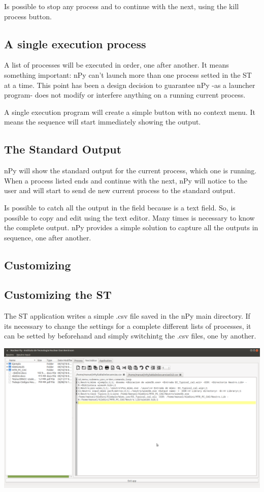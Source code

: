 \documentclass[a4paper,10pt]{article}
\begin{document}
Is possible to stop any process and to continue with the next, using the kill process button.

\subsection{A single execution process}

A list of processes will be executed in order, one after another. It means something important: nPy can't launch more than one process setted in the ST at a time. This point has been a design decision to guarantee nPy -as a launcher program- does not modify or interfere anything on a running current process.

A single execution program will create a simple button with no context menu. It means the sequence will start immediately showing the output.

\subsection{The Standard Output}

nPy will show the standard output for the current process, which one is running. When a process listed ends and continue with the next, nPy will notice to the user and will start to send de new current process to the standard output.

Is possible to catch all the output in the field because is a text field. So, is possible to copy and edit using the text editor. Many times is necessary to know the complete output. nPy provides a simple solution to capture all the outputs in sequence, one after another.

\subsection{Customizing}

\subsection{Customizing the ST}

The ST application writes a simple .csv file saved in the nPy main directory. If its necessary to change the settings for a complete different lists of processes, it can be setted by beforehand and simply switchintg the .csv files, one by another.

\begin{center}
 \includegraphics[width=\textwidth]{img/tablaDeSecuenciasConfig.png}
\end{center}
\end{document}
